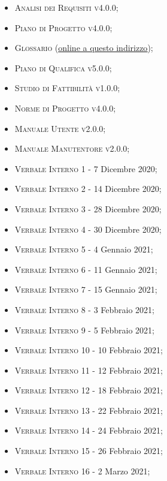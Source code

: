\documentclass[10pt,stdletter,dateno,sigright]{newlfm}  %
\begin{document}
\begin{newlfm}
        \begin{multicols}{2}
            \begin{itemize}
                \item \textsc{Analisi dei Requisiti v4.0.0;}
                \item \textsc{Piano di Progetto v4.0.0;}
                \item \textsc{Glossario }(\href{https://github.com/Three-Way-Milkshake/docs/wiki/Glossario}{\underline{online a questo indirizzo}});
                \item \textsc{Piano di Qualifica v5.0.0;}
                \item \textsc{Studio di Fattibilità v1.0.0;}
                \item \textsc{Norme di Progetto v4.0.0;}
                \item \textsc{Manuale Utente v2.0.0;}
                \item \textsc{Manuale Manutentore v2.0.0;}
                \item \textsc{Verbale Interno 1} - 7 Dicembre 2020;
            \item \textsc{Verbale Interno 2} - 14 Dicembre 2020;
            \item \textsc{Verbale Interno 3} - 28 Dicembre 2020;
            \item \textsc{Verbale Interno 4} - 30 Dicembre 2020;
            \item \textsc{Verbale Interno 5} - 4 Gennaio 2021;
            \item \textsc{Verbale Interno 6} - 11 Gennaio 2021;
            \item \textsc{Verbale Interno 7} - 15 Gennaio 2021;
            \item \textsc{Verbale Interno 8} - 3 Febbraio 2021;
            \item \textsc{Verbale Interno 9} - 5 Febbraio 2021;
            \item \textsc{Verbale Interno 10} - 10 Febbraio 2021;
            \item \textsc{Verbale Interno 11} - 12 Febbraio 2021;
            \item \textsc{Verbale Interno 12} - 18 Febbraio 2021;
            \item \textsc{Verbale Interno 13} - 22 Febbraio 2021;
            \item \textsc{Verbale Interno 14} - 24 Febbraio 2021;
            \item \textsc{Verbale Interno 15} - 26 Febbraio 2021;
            \item \textsc{Verbale Interno 16} - 2 Marzo 2021;


\end{itemize}
\end{multicols}
\end{newlfm}
\end{document}
